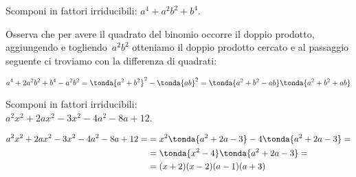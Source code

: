 % 
% 
% 
% 

\begin{esempio}{}{}
Scomponi in fattori irriducibili: \(a^4+a^{2}b^{2}+b^4\).

Osserva che per avere il quadrato del binomio occorre il doppio
prodotto, aggiungendo e togliendo~\(a^{2}b^{2}\) otteniamo il doppio
prodotto cercato e al passaggio seguente ci troviamo con la differenza
di quadrati:

\vspace{-1em}
\[a^4+2a^2b^2+b^4 -a^2b^2=\tonda{a^2+b^2}^2-\tonda{ab}^2%
=\tonda{a^2+b^2 -ab}\tonda{a^2+b^2 +ab}\]

\end{esempio}
% 
% 

\begin{esempio}{}{}
Scomponi in fattori irriducibili: \\
\(a^{2}x^2+2ax^2-3x^2-4a^{2}-8a+12\).

\vspace{-1em}
\begin{align*}
a^{2}x^2+2ax^2-3x^2-4a^{2}-8a+12 =
&=x^2\tonda{a^{2}+2a-3}-4\tonda{a^{2}+2a-3}=\\
&=\tonda{x^2-4}\tonda{a^{2}+2a-3}=\\
&=(x+2)(x-2)(a-1)(a+3)\\
\end{align*}
\end{esempio}

